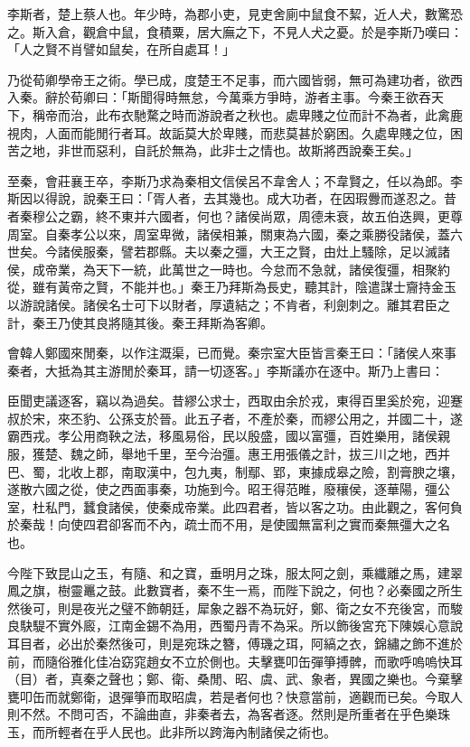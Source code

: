 
\begin{pinyinscope}
李斯者，楚上蔡人也。年少時，為郡小吏，見吏舍廁中鼠食不絜，近人犬，數驚恐之。斯入倉，觀倉中鼠，食積粟，居大廡之下，不見人犬之憂。於是李斯乃嘆曰：「人之賢不肖譬如鼠矣，在所自處耳！」

乃從荀卿學帝王之術。學已成，度楚王不足事，而六國皆弱，無可為建功者，欲西入秦。辭於荀卿曰：「斯聞得時無怠，今萬乘方爭時，游者主事。今秦王欲吞天下，稱帝而治，此布衣馳騖之時而游說者之秋也。處卑賤之位而計不為者，此禽鹿視肉，人面而能閒行者耳。故詬莫大於卑賤，而悲莫甚於窮困。久處卑賤之位，困苦之地，非世而惡利，自託於無為，此非士之情也。故斯將西說秦王矣。」

至秦，會莊襄王卒，李斯乃求為秦相文信侯呂不韋舍人；不韋賢之，任以為郎。李斯因以得說，說秦王曰：「胥人者，去其幾也。成大功者，在因瑕釁而遂忍之。昔者秦穆公之霸，終不東并六國者，何也？諸侯尚眾，周德未衰，故五伯迭興，更尊周室。自秦孝公以來，周室卑微，諸侯相兼，關東為六國，秦之乘勝役諸侯，蓋六世矣。今諸侯服秦，譬若郡縣。夫以秦之彊，大王之賢，由灶上騷除，足以滅諸侯，成帝業，為天下一統，此萬世之一時也。今怠而不急就，諸侯復彊，相聚約從，雖有黃帝之賢，不能并也。」秦王乃拜斯為長史，聽其計，陰遣謀士齎持金玉以游說諸侯。諸侯名士可下以財者，厚遺結之；不肯者，利劍刺之。離其君臣之計，秦王乃使其良將隨其後。秦王拜斯為客卿。

會韓人鄭國來閒秦，以作注溉渠，已而覺。秦宗室大臣皆言秦王曰：「諸侯人來事秦者，大抵為其主游閒於秦耳，請一切逐客。」李斯議亦在逐中。斯乃上書曰：

臣聞吏議逐客，竊以為過矣。昔繆公求士，西取由余於戎，東得百里奚於宛，迎蹇叔於宋，來丕豹、公孫支於晉。此五子者，不產於秦，而繆公用之，并國二十，遂霸西戎。孝公用商鞅之法，移風易俗，民以殷盛，國以富彊，百姓樂用，諸侯親服，獲楚、魏之師，舉地千里，至今治彊。惠王用張儀之計，拔三川之地，西并巴、蜀，北收上郡，南取漢中，包九夷，制鄢、郢，東據成皋之險，割膏腴之壤，遂散六國之從，使之西面事秦，功施到今。昭王得范睢，廢穰侯，逐華陽，彊公室，杜私門，蠶食諸侯，使秦成帝業。此四君者，皆以客之功。由此觀之，客何負於秦哉！向使四君卻客而不內，疏士而不用，是使國無富利之實而秦無彊大之名也。

今陛下致昆山之玉，有隨、和之寶，垂明月之珠，服太阿之劍，乘纖離之馬，建翠鳳之旗，樹靈鼉之鼓。此數寶者，秦不生一焉，而陛下說之，何也？必秦國之所生然後可，則是夜光之璧不飾朝廷，犀象之器不為玩好，鄭、衛之女不充後宮，而駿良駃騠不實外廄，江南金錫不為用，西蜀丹青不為采。所以飾後宮充下陳娛心意說耳目者，必出於秦然後可，則是宛珠之簪，傅璣之珥，阿縞之衣，錦繡之飾不進於前，而隨俗雅化佳冶窈窕趙女不立於側也。夫擊甕叩缶彈箏搏髀，而歌呼嗚嗚快耳（目）者，真秦之聲也；鄭、衛、桑閒、昭、虞、武、象者，異國之樂也。今棄擊甕叩缶而就鄭衛，退彈箏而取昭虞，若是者何也？快意當前，適觀而已矣。今取人則不然。不問可否，不論曲直，非秦者去，為客者逐。然則是所重者在乎色樂珠玉，而所輕者在乎人民也。此非所以跨海內制諸侯之術也。


\end{pinyinscope}
